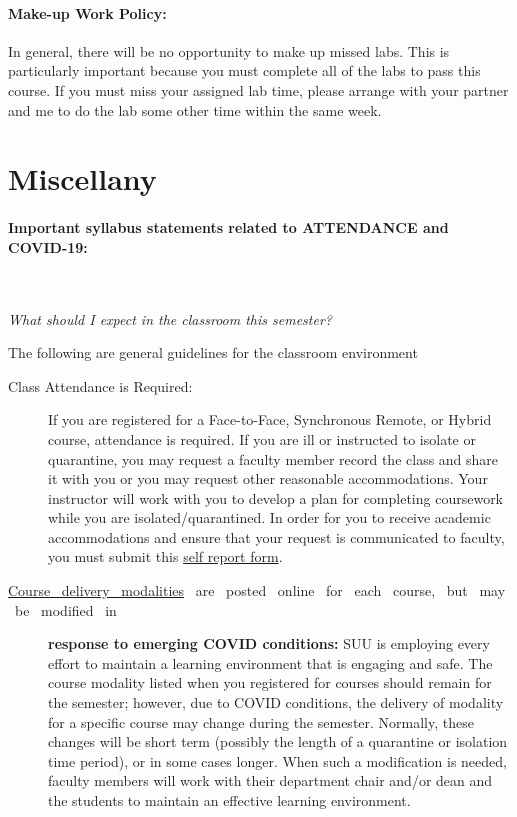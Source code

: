 \documentclass[12pt, letterpaper]{article}
\begin{document}
\paragraph{Make-up Work Policy:}
In general, there will be no opportunity to make up missed labs. This is particularly important because you must complete all of the labs to pass this course. If you must miss your assigned lab time, please arrange with your partner and me to do the lab some other time within the same week.


\section*{Miscellany}

\paragraph{Important syllabus statements related to ATTENDANCE and COVID-19:} ~

\noindent\emph{What should I expect in the classroom this semester?}

\noindent The following are general guidelines for the classroom environment
\begin{description}
	\item[Class Attendance is Required:] If you are registered for a Face-to-Face, Synchronous Remote, or Hybrid course, attendance is required. If you are ill or instructed to isolate or quarantine, you may request a faculty member record the class and share it with you or you may request other reasonable accommodations. Your instructor will work with you to develop a plan for completing coursework while you are isolated/quarantined. In order for you to receive academic accommodations and ensure that your request is communicated to faculty, you must submit this \href{https://my.suu.edu/covid/selfreport/}{self report form}.
	\item[\href{https://www.suu.edu/registrar/onlinehybrid.html}{Course ~delivery ~modalities} ~are ~posted ~online ~for ~each ~course, ~but ~may ~be ~modified ~in] \textbf{response to emerging COVID conditions:} SUU is employing every effort to maintain a learning environment that is engaging and safe. The course modality listed when you registered for courses should remain for the semester; however, due to COVID conditions, the delivery of modality for a specific course may change during the semester. Normally, these changes will be short term (possibly the length of a quarantine or isolation time period), or in some cases longer. When such a modification is needed, faculty members will work with their department chair and/or dean and the students to maintain an effective learning environment.
\end{description}
\end{document}
